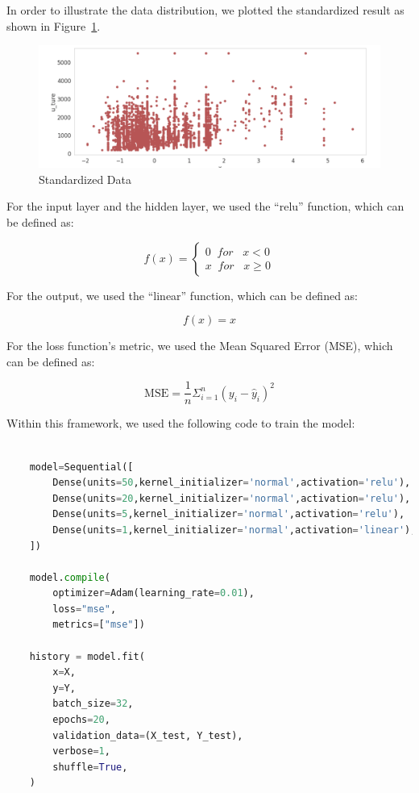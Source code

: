 \documentclass{scrartcl}
\begin{document}
\newpage

\noindent In order to illustrate the data distribution, we plotted the standardized result as shown in Figure~\ref{fig:NN4}. 

\begin{figure}[H]
	\begin{center}
		\includegraphics[scale=1.0]{Graphics/Neural Network Images/NN4.png}
	\end{center}
	\caption{Standardized Data}
	\label{fig:NN4}
\end{figure}


\noindent For the input layer and the hidden layer, we used the “relu” function, which can be defined as:

\[f(x) = \left\{\begin{matrix}
0 \;\;for \;\;\;x<0\\ 
x \;\;for \;\;\;x\geqslant 0
\end{matrix}\right.\]

\noindent For the output, we used the “linear” function, which can be defined as: 

\[f(x) = x\]

\noindent For the loss function’s metric, we used the Mean Squared Error (MSE), which can be defined as:

\[\mathrm{MSE}=\frac{1}{n} \Sigma_{i=1}^n\left(y_i-\hat{y}_i\right)^2\]

\noindent Within this framework, we used the following code to train the model:

\begin{lstlisting}[language=Python, caption= Code for training overall data, basicstyle=\tiny,captionpos=b]

    model=Sequential([
        Dense(units=50,kernel_initializer='normal',activation='relu'),    
        Dense(units=20,kernel_initializer='normal',activation='relu'),
        Dense(units=5,kernel_initializer='normal',activation='relu'),
        Dense(units=1,kernel_initializer='normal',activation='linear'),
    ])

    model.compile(
        optimizer=Adam(learning_rate=0.01),
        loss="mse",
        metrics=["mse"])

    history = model.fit(
        x=X,
        y=Y,
        batch_size=32,
        epochs=20,
        validation_data=(X_test, Y_test),
        verbose=1,
        shuffle=True,
    )

\end{lstlisting}
\end{document}
